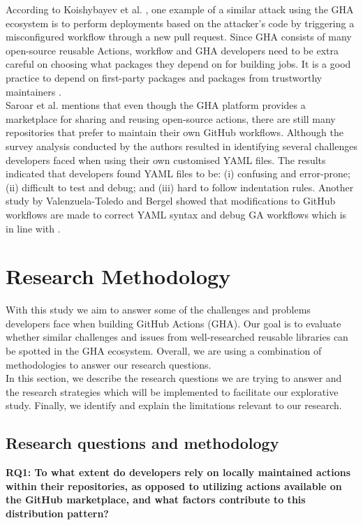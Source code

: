 \documentclass[conference]{IEEEtran}
\begin{document}
According to Koishybayev et al. \cite{b21}, one example of a similar attack using the GHA ecosystem is to perform deployments based on the attacker’s code by triggering a misconfigured workflow through a new pull request. Since GHA consists of many open-source reusable Actions, workflow and GHA developers need to be extra careful on choosing what packages they depend on for building jobs. It is a good practice to depend on first-party packages and packages from trustworthy maintainers \cite{b12}. \\

Saroar et al. \cite{b2} mentions that even though the GHA platform provides a marketplace for sharing and reusing open-source actions, there are still many repositories that prefer to maintain their own GitHub workflows. Although the survey analysis conducted by the authors resulted in identifying several challenges developers faced when using their own customised YAML files.  The results indicated that developers found YAML files to be: (i) confusing and error-prone; (ii) difficult to test and debug; and (iii) hard to follow indentation rules. Another study by Valenzuela-Toledo and Bergel \cite{b22}  showed that modifications to GitHub workflows are made to correct YAML syntax and debug GA workflows which is in line with \cite{b2}.


\section{Research Methodology}
With this study we aim to answer some of the challenges and problems developers face when building GitHub Actions (GHA). Our goal is to evaluate whether similar challenges and issues from well-researched reusable libraries can be spotted in the GHA ecosystem. Overall,  we are using a combination of methodologies to answer our research questions.\\

In this section, we describe the research questions we are trying to answer and the research strategies which will be implemented to facilitate our explorative study. Finally, we identify and explain the limitations relevant to our research.

\subsection{Research questions and methodology}

\textbf{RQ1: To what extent do developers rely on locally maintained actions within their repositories, as opposed to utilizing actions available on the GitHub marketplace, and what factors contribute to this distribution pattern?}\\
\end{document}
